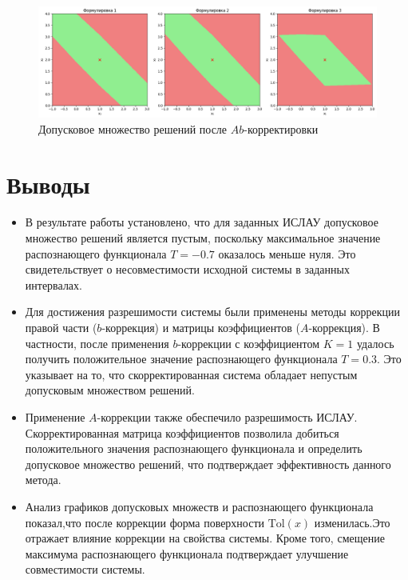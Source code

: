 \documentclass{article}
\begin{document}
  \begin{figure}[htbp!]
		\begin{center}
			\includegraphics[width = \textwidth]{tol_functional_ab_corrected}
			\caption{Допусковое множество решений после \( Ab \)-корректировки}
      \label{figure:tol_functional_ab_corrected}
		\end{center}
	\end{figure}

  \section{Выводы}

  \begin{itemize}
    \item В результате работы установлено, что для заданных ИСЛАУ
    допусковое множество решений является пустым, поскольку максимальное
    значение распознающего функционала \( T = -0.7 \) оказалось меньше
    нуля. Это свидетельствует о несовместимости исходной системы в
    заданных интервалах.
    \item Для достижения разрешимости системы были применены методы
    коррекции правой части (\( b \)-коррекция) и матрицы коэффициентов
    (\( A \)-коррекция). В частности, после применения \( b \)-коррекции с
    коэффициентом \( K = 1 \) удалось получить положительное значение
    распознающего функционала \( T = 0.3 \). Это указывает на то, что
    скорректированная система обладает непустым допусковым множеством
    решений.
    \item Применение \( A \)-коррекции также обеспечило разрешимость ИСЛАУ.
    Скорректированная матрица коэффициентов позволила добиться
    положительного значения распознающего функционала и определить
    допусковое множество решений, что подтверждает эффективность данного
    метода.
    \item Анализ графиков допусковых множеств и распознающего функционала
    показал,что после коррекции форма поверхности \( \text{Tol} (x) \)
    изменилась.Это отражает влияние коррекции на свойства системы. Кроме
    того, смещение максимума распознающего функционала подтверждает
    улучшение совместимости системы.
  \end{itemize}
\end{document}
